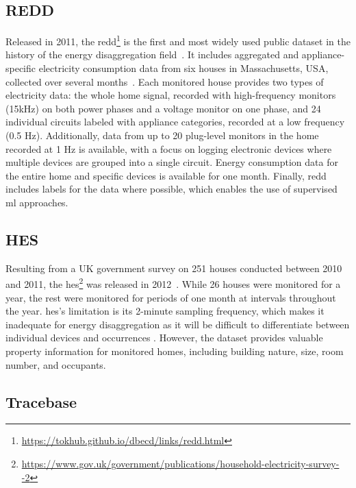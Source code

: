 \subsection{REDD}

Released in 2011, the \acrlong{redd}\footnote{\url{https://tokhub.github.io/dbecd/links/redd.html}} is the first and most widely used public dataset in the history of the energy disaggregation field~\parencite{iqbalCriticalReviewStateoftheart2021}. It includes aggregated and appliance-specific electricity consumption data from six houses in Massachusetts, USA, collected over several months~\parencite{kolterREDDPublicData2011}. Each monitored house provides two types of electricity data: the whole home signal, recorded with high-frequency monitors (15kHz) on both power phases and a voltage monitor on one phase, and 24 individual circuits labeled with appliance categories, recorded at a low frequency (0.5 Hz). Additionally, data from up to 20 plug-level monitors in the home recorded at 1 Hz is available, with a focus on logging electronic devices where multiple devices are grouped into a single circuit. Energy consumption data for the entire home and specific devices is available for one month. Finally, \acrshort{redd} includes labels for the data where possible, which enables the use of supervised \acrshort{ml} approaches.

\subsection{HES}

Resulting from a UK government survey on 251 houses conducted between 2010 and 2011, the \acrlong{hes}\footnote{\url{https://www.gov.uk/government/publications/household-electricity-survey--2}} was released in 2012~\parencite{zimmermannHouseholdElectricitySurvey2012}. While 26 houses were monitored for a year, the rest were monitored for periods of one month at intervals throughout the year. \acrshort{hes}'s limitation is its 2-minute sampling frequency, which makes it inadequate for energy disaggregation as it will be difficult to differentiate between individual devices and occurrences \parencite{himeurBuildingPowerConsumption2020}. However, the dataset provides valuable property information for monitored homes, including building nature, size, room number, and occupants.

\subsection{Tracebase}

